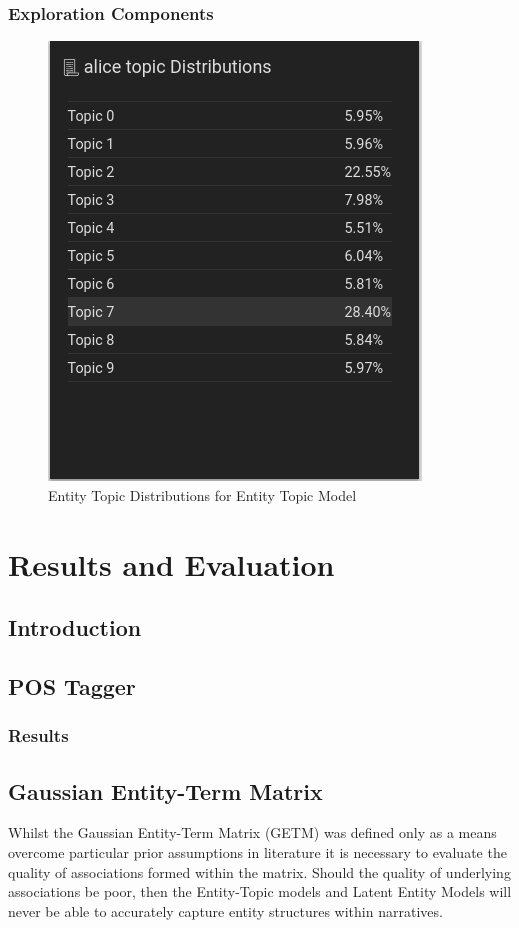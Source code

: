 \documentclass[10pt]{report}
\begin{document}
\subsection{Exploration Components}
\begin{figure}[B!]
  \centering
  \includegraphics[scale=0.5]{topic_dist_pct}
\caption{Entity Topic Distributions for Entity Topic Model\label{fig:entity_topic_pct}}
\end{figure}



%
%
%
%
\chapter{Results and Evaluation}
\section{Introduction}

\section{POS Tagger}

\subsection{Results}


\section{Gaussian Entity-Term Matrix}
Whilst the Gaussian Entity-Term Matrix (GETM) was defined only as a means overcome particular prior assumptions in literature it is necessary to evaluate the quality of associations formed within the matrix. Should the quality of underlying associations be poor, then the Entity-Topic models and Latent Entity Models will never be able to accurately capture entity structures within narratives.
\end{document}
